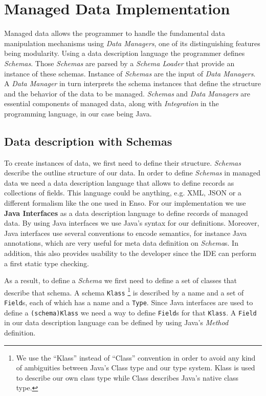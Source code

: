 \section{Managed Data Implementation}\label{sec:Managed Data Implementation}
Managed data allows the programmer to handle the fundamental data manipulation mechanisms using \textit{Data Managers}, one of its distinguishing features being modularity.
Using a data description language the programmer defines \textit{Schemas}.
Those \textit{Schemas} are parsed by a \textit{Schema Loader} that provide an instance of these schemas.
Instance of \textit{Schemas} are the input of \textit{Data Managers}. 
A \textit{Data Manager} in turn interprets the schema instances that define the structure and the behavior of the data to be managed.
\textit{Schemas} and \textit{Data Managers} are essential components of managed data, along with \textit{Integration} in the programming language, in our case being Java.

\subsection{Data description with Schemas}\label{Schema Definition}
To create instances of data, we first need to define their structure.
\textit{Schemas} describe the outline structure of our data.
In order to define \textit{Schemas} in managed data we need a data description language that allows to define records as collections of fields.
This language could be anything, e.g. XML, JSON or a different formalism like the one used in Enso.
For our implementation we use \textbf{Java Interfaces} as a data description language to define records of managed data.
By using Java interfaces we use Java's syntax for our definitions.
Moreover, Java interfaces use several conventions to encode semantics, for instance Java annotations, which are very useful for meta data definition on \textit{Schema}s.
In addition, this also provides usability to the developer since the IDE can perform a first static type checking.

As a result, to define a \textit{Schema} we first need to define a set of classes that describe that schema.
A schema \texttt{Klass} \footnote{
	We use the ``Klass'' instead of ``Class'' convention in order to avoid any kind of ambiguities between Java's Class type and our type system. Klass is used to describe our own class type while Class describes Java's native class type.} 
is described by a name and a set of \texttt{Field}s, each of which has a name and a \texttt{Type}.
Since Java interfaces are used to define a \texttt{(schema)Klass} we need a way to define \texttt{Field}s for that \texttt{Klass}.
A \texttt{Field} in our data description language can be defined by using Java's \textit{Method} definition.

